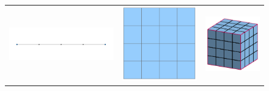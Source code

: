\begin{figure}[h]
\begin{tabular}{ccc}
  \includegraphics[scale=0.15]{./img/linea-dividida.png} &   \includegraphics[scale=0.15]{./img/cuadrado-dividido.png} & \includegraphics[scale=0.2]{./img/cubo-dividido.png}\\

\end{tabular}
\end{figure}
